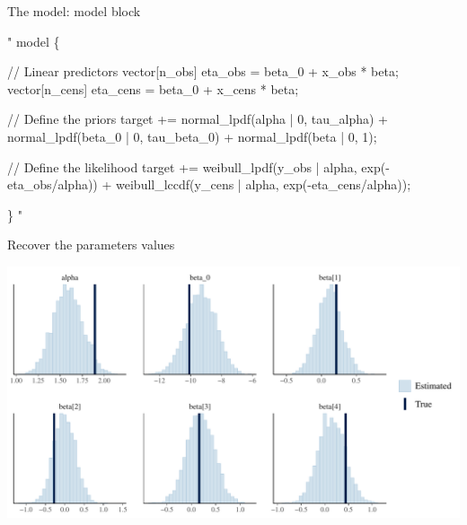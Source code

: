 \documentclass[ignorenonframetext,a4paper]{beamer}
\newenvironment{Shaded}{\begin{snugshade}}{\end{snugshade}}
\newcommand{\StringTok}[1]{\textcolor[rgb]{0.31,0.60,0.02}{#1}}
\begin{document}
\begin{frame}[fragile]{The model: model block}

\scriptsize

\begin{Shaded}
\begin{Highlighting}[]
\StringTok{"}
\StringTok{model \{}

\StringTok{  // Linear predictors}
\StringTok{  vector[n_obs] eta_obs = beta_0 + x_obs * beta;}
\StringTok{  vector[n_cens] eta_cens = beta_0 + x_cens * beta;}

\StringTok{  // Define the priors}
\StringTok{  target += normal_lpdf(alpha | 0, tau_alpha) +}
\StringTok{            normal_lpdf(beta_0 | 0, tau_beta_0) +}
\StringTok{            normal_lpdf(beta | 0, 1);}

\StringTok{  // Define the likelihood}
\StringTok{  target += weibull_lpdf(y_obs | alpha, exp(-eta_obs/alpha)) +}
\StringTok{            weibull_lccdf(y_cens | alpha, exp(-eta_cens/alpha));}

\StringTok{\}}
\StringTok{"}
\end{Highlighting}
\end{Shaded}

\end{frame}

\begin{frame}{Recover the parameters values}

\includegraphics{DB_presentation_case_study_files/figure-beamer/unnamed-chunk-9-1.pdf}

\end{frame}
\end{document}
